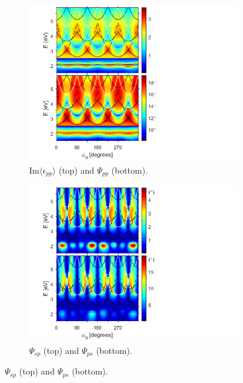 \begin{figure}
    \begin{subfigure}{0.5\textwidth}
    \centering
    \includegraphics[width=\linewidth, trim=1cm  0cm 5.8cm 0cm, clip]{figures/Appendix/S5A/S5A_eps_psi_all_ExpData.png}
    \caption{$\text{Im}\langle\epsilon_{pp}\rangle$ (top) and $\Psi_{pp}$ (bottom).}
    \label{}
    \end{subfigure}
    \begin{subfigure}{0.5\textwidth}
    \centering
    \includegraphics[width=\linewidth, trim=1cm  0cm 5.8cm 0cm, clip]{figures/Appendix/S5A/S5A_psi_sp_ps_all_ExpData.png}
    \caption{$\Psi_{sp}$ (top) and $\Psi_{ps}$ (bottom).}
    \label{}
    \end{subfigure}

\end{figure}
